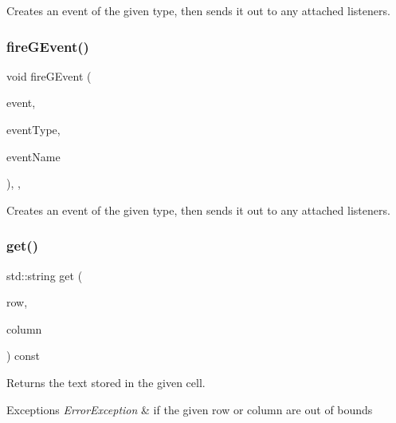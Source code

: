 Creates an event of the given type, then sends it out to any attached listeners. 

\mbox{\label{classsgl_1_1GObservable_a2a70a7d7435ff0c3b80bb4d70da19e0d}} 
\subsubsection{\texorpdfstring{fire\+G\+Event()}{fireGEvent()}\hspace{0.1cm}{\footnotesize\ttfamily [8/8]}}
{\footnotesize\ttfamily void fire\+G\+Event (\begin{DoxyParamCaption}\item[{Q\+Window\+State\+Change\+Event $\ast$}]{event,  }\item[{\mbox{\hyperlink{namespacesgl_a2628ea8d12e8b2563c32f05dc7fff6fa}{Event\+Type}}}]{event\+Type,  }\item[{const std\+::string \&}]{event\+Name }\end{DoxyParamCaption})\hspace{0.3cm}{\ttfamily [protected]}, {\ttfamily [virtual]}, {\ttfamily [inherited]}}



Creates an event of the given type, then sends it out to any attached listeners. 

\mbox{\label{classsgl_1_1GTable_aaa9971dcb7e1b082abd3b9010667f041}} 
\subsubsection{\texorpdfstring{get()}{get()}}
{\footnotesize\ttfamily std\+::string get (\begin{DoxyParamCaption}\item[{int}]{row,  }\item[{int}]{column }\end{DoxyParamCaption}) const\hspace{0.3cm}{\ttfamily [virtual]}}



Returns the text stored in the given cell. 


\begin{DoxyExceptions}{Exceptions}
{\em Error\+Exception} & if the given row or column are out of bounds \\
\hline
\end{DoxyExceptions}
\mbox{\label{classsgl_1_1GInteractor_a69f8d23ed8f207fbecad99960776e942}} 
